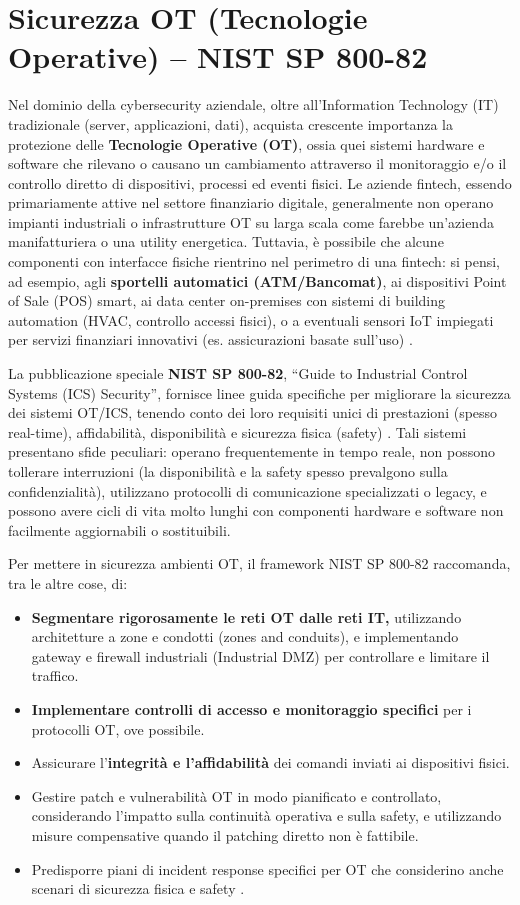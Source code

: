 \section{Sicurezza OT (Tecnologie Operative) – NIST SP 800-82}
\label{sec:sicurezza_ot}
Nel dominio della cybersecurity aziendale, oltre all’Information Technology (IT) tradizionale (server, applicazioni, dati), acquista crescente importanza la protezione delle \textbf{Tecnologie Operative (OT)}, ossia quei sistemi hardware e software che rilevano o causano un cambiamento attraverso il monitoraggio e/o il controllo diretto di dispositivi, processi ed eventi fisici. Le aziende fintech, essendo primariamente attive nel settore finanziario digitale, generalmente non operano impianti industriali o infrastrutture OT su larga scala come farebbe un'azienda manifatturiera o una utility energetica. Tuttavia, è possibile che alcune componenti con interfacce fisiche rientrino nel perimetro di una fintech: si pensi, ad esempio, agli \textbf{sportelli automatici (ATM/Bancomat)}, ai dispositivi Point of Sale (POS) smart, ai data center on-premises con sistemi di building automation (HVAC, controllo accessi fisici), o a eventuali sensori IoT impiegati per servizi finanziari innovativi (es. assicurazioni basate sull'uso) \cite{nistSP80082}.

La pubblicazione speciale \textbf{NIST SP 800-82}, \enquote{Guide to Industrial Control Systems (ICS) Security}, fornisce linee guida specifiche per migliorare la sicurezza dei sistemi OT/ICS, tenendo conto dei loro requisiti unici di prestazioni (spesso real-time), affidabilità, disponibilità e sicurezza fisica (safety) \cite{nistSP80082}. Tali sistemi presentano sfide peculiari: operano frequentemente in tempo reale, non possono tollerare interruzioni (la disponibilità e la safety spesso prevalgono sulla confidenzialità), utilizzano protocolli di comunicazione specializzati o legacy, e possono avere cicli di vita molto lunghi con componenti hardware e software non facilmente aggiornabili o sostituibili.

Per mettere in sicurezza ambienti OT, il framework NIST SP 800-82 raccomanda, tra le altre cose, di:
\begin{itemize}
    \item \textbf{Segmentare rigorosamente le reti OT dalle reti IT,} utilizzando architetture a zone e condotti (zones and conduits), e implementando gateway e firewall industriali (Industrial DMZ) per controllare e limitare il traffico.
    \item \textbf{Implementare controlli di accesso e monitoraggio specifici} per i protocolli OT, ove possibile.
    \item Assicurare l’\textbf{integrità e l’affidabilità} dei comandi inviati ai dispositivi fisici.
    \item Gestire patch e vulnerabilità OT in modo pianificato e controllato, considerando l'impatto sulla continuità operativa e sulla safety, e utilizzando misure compensative quando il patching diretto non è fattibile.
    \item Predisporre piani di incident response specifici per OT che considerino anche scenari di sicurezza fisica e safety \cite{nistSP80082}.
\end{itemize}

